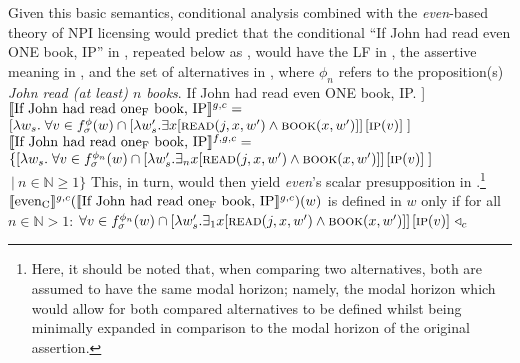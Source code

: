 \noindent Given this basic semantics,  conditional analysis combined with the \textit{even}-based theory of NPI licensing would predict that the conditional \enquote{If John had read even \MakeUppercase{one} book, IP} in , repeated below as , would have the LF in , the assertive meaning in , and the set of alternatives in , where $\phi_n$ refers to the proposition(s) \textit{John read (at least) $n$ books}.
\pex\label{ex:ds-neutral-conditional}
\a If John had read even \MakeUppercase{one} book, IP.
\a[] [even\textsubscript{C} [If John had read one\textsubscript{F} book IP]]
\a $\intension[g,c]{If John had read one\textsubscript{F} book, IP}=$\\$[\lambda w_s.\hspace{1mm}\forall v\in f^{\phi}_\sigma(w)\cap [\lambda w'_s.\exists{x}[\predicate{read}(j,x,w')\land\predicate{book}(x,w')]]\hspace{0.5mm}[\predicate{ip}(v)]\hspace{1mm}]$
\a $\intension[f,g,c]{If John had read one\textsubscript{F} book, IP}=$\\$\{[\lambda w_s.\hspace{1mm}\forall v\in f^{\phi_n}_\sigma(w)\cap [\lambda w'_s.\exists_n{x}[\predicate{read}(j,x,w')\land\predicate{book}(x,w')]]\hspace{0.5mm}[\predicate{ip}(v)]\hspace{1mm}]$\\\emptyfill$~|~n\in\mathbb{N}\geqslant1\}$
\xe
This, in turn, would then yield \textit{even}'s scalar presupposition in .\footnote{Here, it should be noted that, when comparing two alternatives, both are assumed to have the same modal horizon; namely, the modal horizon which would allow for both compared alternatives to be defined whilst being minimally expanded in comparison to the modal horizon of the original assertion.}
\ex
$\intension[g,c]{even\textsubscript{C}}(\intension[g,c]{If John had read one\textsubscript{F} book, IP})(w)$ is defined in $w$ only if for all $n\in\mathbb{N}>1$:
$\forall v\in f^{\phi_n}_\sigma(w)\cap [\lambda w'_s.\exists_1{x}[\predicate{read}(j,x,w')\land\predicate{book}(x,w')]]\hspace{0.5mm}[\predicate{ip}(v)]~\lprob_c$\\\emptyfill
